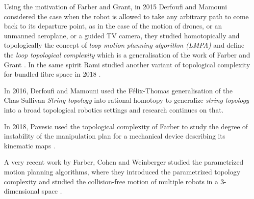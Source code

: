 Using the motivation of Farber and Grant, in 2015 Derfoufi and Mamouni considered the case when the robot is allowed to take any arbitrary path to come back to its departure point, as in the case of the motion of drones, or an unmanned aeroplane, or a guided TV camera, they studied homotopically and topologically the concept of \textit{loop motion planning algorithm (LMPA)}  and define the \textit{loop topological complexity} which is a generalisation of the work of Farber and Grant \cite{derfoufi2015loop}. In the same spirit Rami  studied another variant of topological complexity for bundled fibre space in 2018 \cite{rami2018variant}.

In 2016, Derfoufi and Mamouni used the F\'elix-Thomas generalisation of the Chas-Sullivan \textit{String topology} into rational homotopy to generalize \textit{string topology} into a broad topological robotics settings and research continues on that.

In 2018, Pavesic used the topological complexity of Farber to study the degree of instability of the manipulation plan for a mechanical device describing its kinematic maps \cite{pavesic2018topologist}.

A very recent work by Farber, Cohen and Weinberger studied the parametrized motion planning algorithms, where they introduced the parametrized topology complexity and studied the collision-free motion of multiple robots in a 3-dimensional space \cite{cohen2021topology}.


